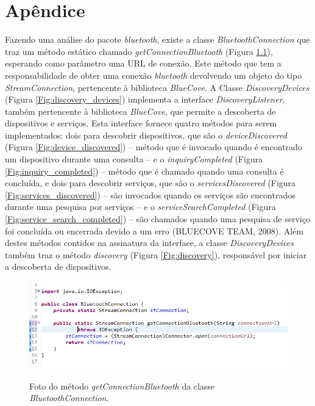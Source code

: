 \chapter{Apêndice}\label{apendicea}

Fazendo uma análise do pacote \textit{bluetooth}, existe a classe \textit{BluetoothConnection} que traz um método estático chamado \textit{getConnectionBluetooth} (Figura \ref{Fig:get_connection_bluetooth}), esperando como parâmetro uma URL de conexão. Este método que tem a responsabilidade de obter uma conexão \textit{bluetooth} devolvendo um objeto do tipo \textit{StreamConnection}, pertencente à biblioteca \textit{BlueCove}. A Classe \textit{DiscoveryDevices} (Figura \ref{Fig:discovery_devices}) implementa a interface \textit{DiscoveryListener}, também pertencente à biblioteca \textit{BlueCove}, que permite a descoberta de dispositivos e serviços. Esta interface fornece quatro métodos para serem implementados: dois para descobrir dispositivos, que são o \textit{deviceDiscovered} (Figura \ref{Fig:device_discovered}) – método que é invocado quando é encontrado um dispositivo durante uma consulta – e o \textit{inquiryCompleted} (Figura \ref{Fig:inquiry_completed}) – método que é chamado quando uma consulta é concluída, e dois para descobrir serviços, que são o \textit{servicesDiscovered} (Figura \ref{Fig:services_discovered}) – são invocados quando os serviços são encontrados durante uma pesquisa por serviços – e o \textit{serviceSearchCompleted} (Figura \ref{Fig:service_search_completed}) – são chamados quando uma pesquisa de serviço foi concluída ou encerrada devido a um erro (BLUECOVE TEAM, 2008)\nocite{bluecovedoc}. Além destes métodos contidos na assinatura da interface, a classe \textit{DiscoveryDevices} também traz o método \textit{discovery} (Figura \ref{Fig:discovery}), responsável por iniciar a descoberta de dispositivos.

\begin{figure}[!ht]
\centering
\caption{Foto do método \textit{getConnectionBluetooth} da classe \textit{BluetoothConnection}.} 
{\includegraphics[scale=.80]{imagens/pacoteBluetooth-BluetoothConnection.png}}\\
 \label{Fig:get_connection_bluetooth}
\end{figure}

